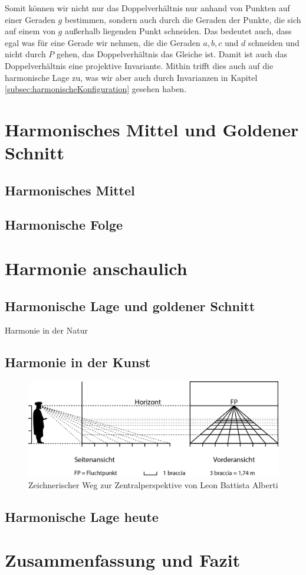 \documentclass[12pt,a4paper]{article}
\begin{document}
Somit können wir nicht nur das Doppelverhältnis nur anhand von Punkten auf einer Geraden $g$ bestimmen, sondern auch durch die Geraden der Punkte, die sich auf einem von $g$ außerhalb liegenden Punkt schneiden. Das bedeutet auch, dass egal was für eine Gerade wir nehmen, die die Geraden $a, b, c$ und $d$ schneiden und nicht durch $P$ gehen, das Doppelverhältnis das Gleiche ist. Damit ist auch das Doppelverhältnis eine projektive Invariante. Mithin trifft dies auch auf die harmonische Lage zu, was wir aber auch durch Invarianzen in Kapitel \ref{subsec:harmonischeKonfiguration} gesehen haben.

\newpage
\section{Harmonisches Mittel und Goldener Schnitt}
\subsection{Harmonisches Mittel}

\subsection{Harmonische Folge}

\newpage
\section{Harmonie anschaulich}

\subsection{Harmonische Lage und goldener Schnitt}
Harmonie in der Natur

\subsection{Harmonie in der Kunst}

\begin{figure}[htbp] 
\centering
\includegraphics[width=\textwidth]{Bilder/braccia.png}
\caption{Zeichnerischer Weg zur Zentralperspektive von Leon Battista Alberti}
\label{fig:braccia}
\end{figure}

\subsection{Harmonische Lage heute}

\newpage
\section{Zusammenfassung und Fazit}

\newpage
\listoffigures

\newpage
{}


\end{document}
